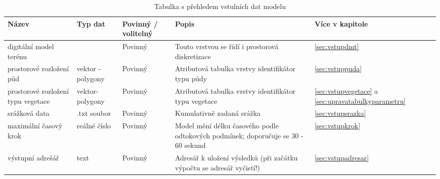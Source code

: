 
% 
\begin{sidewaystable}
\centering
\caption{Tabulka s přehledem vstulních dat modelu}
\label{tab:vstupy}
\small{
\begin{tabular}{p{}lp{}p{}l}
\hline
Název                              & Typ dat                                               & Povinný / volitelný & Popis                                                                                      & Více v kapitole                                                 \\ \hline \hline
digitální model terénu             & \cellcolor[HTML]{96FFFB}{\color[HTML]{000000} raster} & Povinný           & Touto vrstvou se řídí i prostorová diskretizace                                                 & \ref{sec:vstupdmt}                                           \\ \hline
prostorové rozložení půd           & \cellcolor[HTML]{FFC702}vektor - polygony             & Povinný           & Atributová tabulka vrstvy identifikátor typu půdy                                               & \ref{sec:vstuppuda}                                          \\ \hline
prostorové rozložení typu vegetace & \cellcolor[HTML]{FFC702}vektor- polygony              & Povinný           & Atributová tabulka vrstvy identifikátor typu vegetace                                           & \ref{sec:vstupvegetace} a \ref{sec:upravatabulkyparametru}   \\ \hline
srážková data                      & .txt soubor                                           & Povinný           & Kumulativně zadaná srážka                                                                       & \ref{sec:vstupsrazka}                                        \\ \hline
maximální časový krok              & reálné číslo                                          & Povinný           & Model mění délku časového podle odtokových podmínek; doporučuje se 30 - 60 sekund               & \ref{sec:vstupkrok}                                          \\ \hline
výstupní adrešář                   & text                                                  & Povinný           & Adresář k uložení výsledků (při začátku výpočtu se adresář vyčistí!)                            & \ref{sec:vstupadresar}                                       \\ \hline

\end{tabular}}
\end{sidewaystable}
